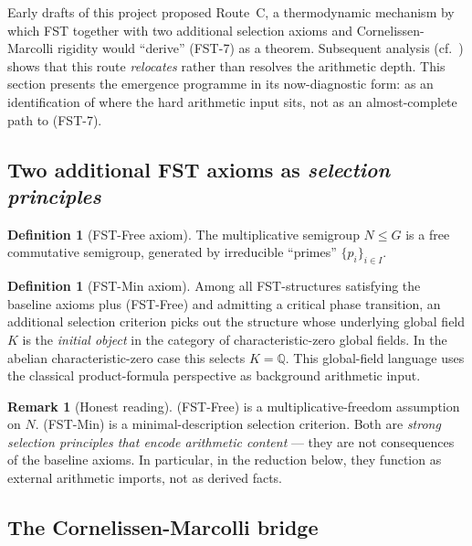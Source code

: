 \documentclass[11pt,a4paper]{article}
\theoremstyle{plain}
\theoremstyle{definition}
\newtheorem{definition}[theorem]{Definition}
\newtheorem{remark}[theorem]{Remark}
\newcommand{\Q}{\mathbb{Q}}
\begin{document}
Early drafts of this project proposed Route~C, a thermodynamic
mechanism by which FST together with two additional selection
axioms and Cornelissen-Marcolli rigidity would ``derive'' (FST-7) as
a theorem.  Subsequent analysis
(cf.~\cite{L1KAttack,EmergenceAttack}) shows that this route
\emph{relocates} rather than resolves the arithmetic depth.  This
section presents the emergence programme in its now-diagnostic form:
as an identification of where the hard arithmetic input sits, not
as an almost-complete path to (FST-7).

\subsection{Two additional FST axioms as \emph{selection principles}}
\label{sec:extra-axioms}

\begin{definition}[FST-Free axiom]\label{def:fst-free}
The multiplicative semigroup $N \le G$ is a free commutative
semigroup, generated by irreducible ``primes'' $\{p_i\}_{i \in I}$.
\end{definition}

\begin{definition}[FST-Min axiom]\label{def:fst-min}
Among all FST-structures satisfying the baseline axioms plus
(FST-Free) and admitting a critical phase transition, an additional
selection criterion picks out the structure whose underlying global
field $K$ is the \emph{initial object} in the category of
characteristic-zero global fields.  In the abelian characteristic-zero
case this selects $K = \Q$.  This global-field language uses the
classical product-formula perspective \cite{ArtinWhaples1945} as
background arithmetic input.
\end{definition}

\begin{remark}[Honest reading]
\label{rem:fst-free-min-imports}
(FST-Free) is a multiplicative-freedom assumption on $N$.  (FST-Min)
is a minimal-description selection criterion.  Both are \emph{strong
selection principles that encode arithmetic content} --- they are
not consequences of the baseline axioms.  In particular, in the
reduction below, they function as external arithmetic imports, not
as derived facts.
\end{remark}

\subsection{The Cornelissen-Marcolli bridge}
\label{sec:cm-bridge}
\end{document}
